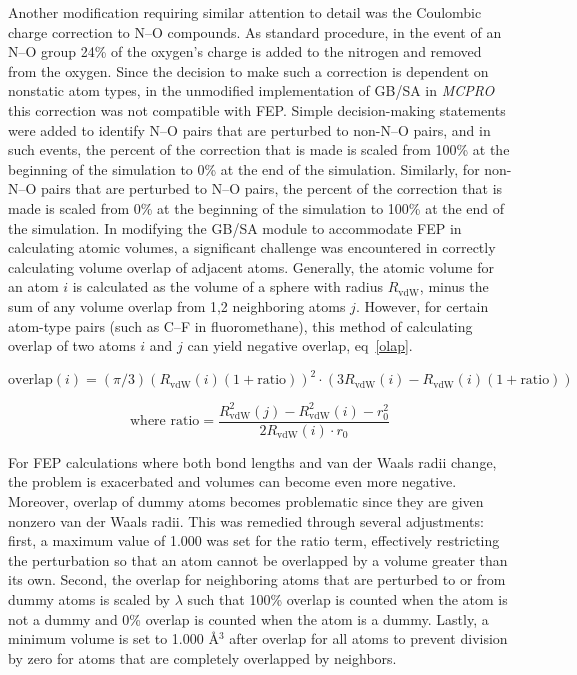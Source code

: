 \documentclass[12pt]{report}
\def\equlab{eq}\def\equslab{Eqs.}
\newcommand*\eq[1]{\equlab~\ref{#1}}
\begin{document}
Another modification requiring similar attention to detail was the Coulombic charge correction to N--O compounds. As standard procedure, in the event of an N--O group 24\% of the oxygen's charge is added to the nitrogen and removed from the oxygen. Since the decision to make such a correction is dependent on nonstatic atom types, in the unmodified implementation of GB/SA in \textit{MCPRO} this correction was not compatible with FEP. Simple decision-making statements were added to identify N--O pairs that are perturbed to non-N--O pairs, and in such events, the percent of the correction that is made is scaled from 100\% at the beginning of the simulation to 0\% at the end of the simulation. Similarly, for non-N--O pairs that are perturbed to N--O pairs, the percent of the correction that is made is scaled from 0\% at the beginning of the simulation to 100\% at the end of the simulation. In modifying the GB/SA module to accommodate FEP in calculating atomic volumes, a significant challenge was encountered in correctly calculating volume overlap of adjacent atoms. Generally, the atomic volume for an atom $i$ is calculated as the volume of a sphere with radius $R_{ \textrm{vdW}}$, minus the sum of any volume overlap from 1,2 neighboring atoms $j$. However, for certain atom-type pairs (such as C--F in fluoromethane), this method of calculating overlap of two atoms $i$ and $j$ can yield negative overlap, \eq{olap}.\vspace*{-0.6cm}

\vspace*{-.4cm}
\begin{equation}
\label{olap}
\textrm{overlap}(i) = (\pi/3)(R_{ \textrm{vdW}}(i)(1+ \textrm{ratio}))^{2}\cdot(3R_{ \textrm{vdW}}(i) - R_{ \textrm{vdW}}(i)(1+ \textrm{ratio}))
\end{equation}
\vspace*{-1.7cm}

\begin{equation*}
\textrm{where ratio} = \frac{R^{2}_{ \textrm{vdW}}(j) - R^{2}_{ \textrm{vdW}}(i) - r^{2}_{0}}{2R_{ \textrm{vdW}}(i) \cdot r_{0}}
\end{equation*}
\vspace*{-0.4cm}

For FEP calculations where both bond lengths and van der Waals radii change, the problem is exacerbated and volumes can become even more negative. Moreover, overlap of dummy atoms becomes problematic since they are given nonzero van der Waals radii. This was remedied through several adjustments: first, a maximum value of 1.000 was set for the ratio term, effectively restricting the perturbation so that an atom cannot be overlapped by a volume greater than its own. Second, the overlap for neighboring atoms that are perturbed to or from dummy atoms is scaled by $\lambda$ such that 100\% overlap is counted when the atom is not a dummy and 0\% overlap is counted when the atom is a dummy. Lastly, a minimum volume is set to 1.000 \AA$^{3}$ after overlap for all atoms to prevent division by zero for atoms that are completely overlapped by neighbors.
\end{document}
